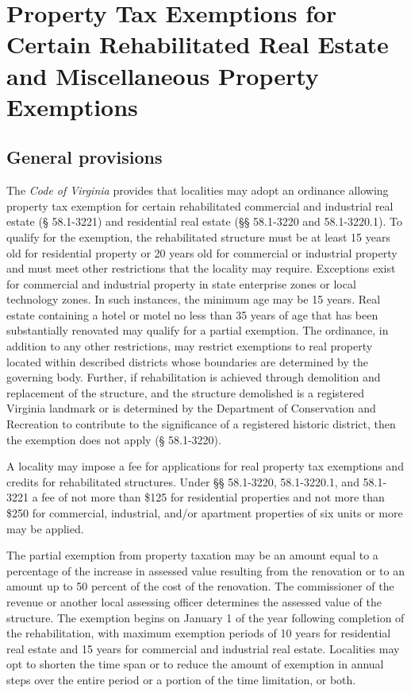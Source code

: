 \documentclass[
]{book}
\begin{document}
\hypertarget{property-tax-exemptions-for-certain-rehabilitated-real-estate-and-miscellaneous-property-exemptions}{%
\chapter{Property Tax Exemptions for Certain Rehabilitated Real Estate and Miscellaneous Property Exemptions}\label{property-tax-exemptions-for-certain-rehabilitated-real-estate-and-miscellaneous-property-exemptions}}

\hypertarget{general-provisions-1}{%
\section{General provisions}\label{general-provisions-1}}

The \emph{Code of Virginia} provides that localities may adopt an ordinance allowing property tax exemption for certain rehabilitated commercial and industrial real estate (§ 58.1-3221) and residential real estate (§§ 58.1-3220 and 58.1-3220.1). To qualify for the exemption, the rehabilitated structure must be at least 15 years old for residential property or 20 years old for commercial or industrial property and must meet other restrictions that the locality may require. Exceptions exist for commercial and industrial property in state enterprise zones or local technology zones. In such instances, the minimum age may be 15 years. Real estate containing a hotel or motel no less than 35 years of age that has been substantially renovated may qualify for a partial exemption. The ordinance, in addition to any other restrictions, may restrict exemptions to real property located within described districts whose boundaries are determined by the governing body. Further, if rehabilitation is achieved through demolition and replacement of the structure, and the structure demolished is a registered Virginia landmark or is determined by the Department of Conservation and Recreation to contribute to the significance of a registered historic district, then the exemption does not apply (§ 58.1-3220).

A locality may impose a fee for applications for real property tax exemptions and credits for rehabilitated structures. Under §§ 58.1-3220, 58.1-3220.1, and 58.1-3221 a fee of not more than \$125 for residential properties and not more than \$250 for commercial, industrial, and/or apartment properties of six units or more may be applied.

The partial exemption from property taxation may be an amount equal to a percentage of the increase in assessed value resulting from the renovation or to an amount up to 50 percent of the cost of the renovation. The commissioner of the revenue or another local assessing officer determines the assessed value of the structure. The exemption begins on January 1 of the year following completion of the rehabilitation, with maximum exemption periods of 10 years for residential real estate and 15 years for commercial and industrial real estate. Localities may opt to shorten the time span or to reduce the amount of exemption in annual steps over the entire period or a portion of the time limitation, or both.
\end{document}
